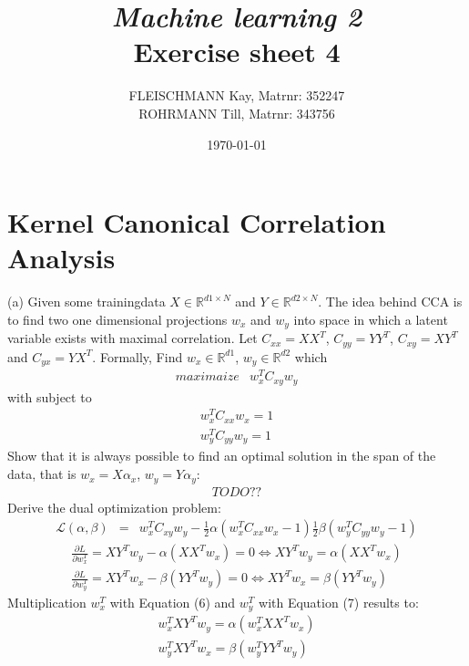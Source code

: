 \documentclass[a4paper, 12pt, titlepage]{article}
\title
{{\em Machine learning 2}\\
Exercise sheet 4}
\author{FLEISCHMANN Kay, Matrnr: 352247\\
	ROHRMANN Till, Matrnr: 343756}
\date{\today}
\begin{document}
\maketitle

\setcounter{section}{5}


\section{Kernel Canonical Correlation Analysis}
(a) Given some trainingdata $X \in \mathbb{R}^{d1 \times N} $ and $Y \in \mathbb{R}^{d2 \times N}$. The idea behind CCA is to find two one dimensional projections  $w_x$ and $w_y$ into  space in which a latent variable exists with maximal correlation. Let $C_{xx} = XX^T$, $C_{yy} = YY^T$, $C_{xy} = XY^T$ and $C_{yx} = YX^T$.
\newline \newline
Formally, Find $w_x \in \mathbb{R}^{d1}$, $w_y \in \mathbb{R}^{d2}$ which
\begin{eqnarray}
  maximaize & w^{T}_{x} C_{xy}w_y
 \end{eqnarray}
with subject to
\begin{eqnarray}
  w^T_xC_{xx}w_x=1 \\
  w^T_yC_{yy}w_y=1 
\end{eqnarray}
Show that it is always possible to find an optimal solution in the span of the data, that is $w_x= X \alpha_x$, $w_y = Y \alpha_y$:
\begin{eqnarray}
TODO ??
\end{eqnarray}
Derive the dual optimization problem: \newline
\begin{eqnarray}
  \mathcal{L}(\alpha, \beta) &=& w^{T}_{x} C_{xy}w_y - \frac{1}{2} \alpha (w^T_xC_{xx}w_x-1) \frac{1}{2} \beta (w^T_yC_{yy}w_y-1)
  \end{eqnarray}
\begin{eqnarray}
  \frac{\partial L}{\partial w^T_x} = XY^Tw_y - \alpha( XX^Tw_x ) = 0  \Leftrightarrow XY^Tw_y = \alpha( XX^Tw_x ) \\
  \frac{\partial L}{\partial w^T_y} = XY^Tw_x - \beta ( YY^Tw_y) = 0 \Leftrightarrow  XY^Tw_x = \beta ( YY^Tw_y)
\end{eqnarray}
Multiplication $w^T_x$ with Equation (6) and $w^T_y$ with Equation (7) results to:
\begin{eqnarray}
  w^T_xXY^Tw_y = \alpha( w^T_xXX^Tw_x ) \\
  w^T_yXY^Tw_x = \beta ( w^T_yYY^Tw_y) 
\end{eqnarray}
\end{document}
